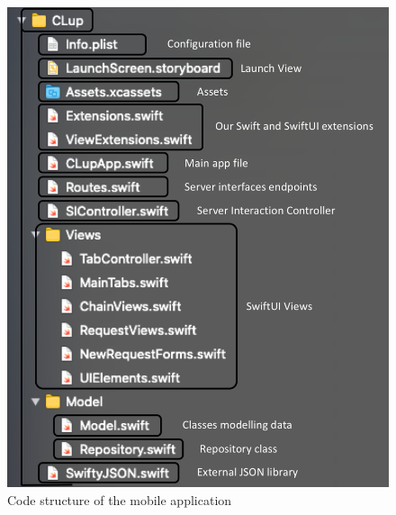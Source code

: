 \documentclass[a4paper,oneside,11pt]{book}
\begin{document}
    \begin{figure}[H]
        \centering
        \includegraphics[width=.8\textwidth, height=\textheight, keepaspectratio]{pictures/codestructure_swift.png}
        \caption{Code structure of the mobile application}
        \label{figure:codestructure_swift}
    \end{figure}
    
    
\end{document}
